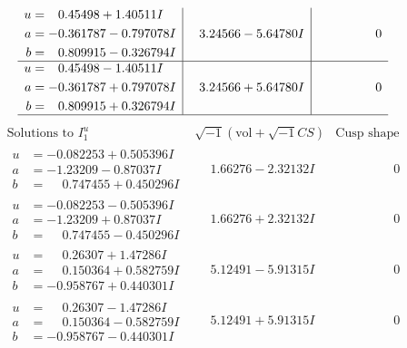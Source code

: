 \documentclass[1p]{elsarticle_modified}
\theoremstyle{definition}
\newcommand{\I}{\sqrt{-1}}
\begin{document}
$$\begin{array}{c|c|c}
\begin{aligned}
u &= \phantom{-}0.45498 + 1.40511 I \\
a &= -0.361787 - 0.797078 I \\
b &= \phantom{-}0.809915 - 0.326794 I\end{aligned}
 & \phantom{-}3.24566 - 5.64780 I & \phantom{-0.000000 } 0 \\ \hline\begin{aligned}
u &= \phantom{-}0.45498 - 1.40511 I \\
a &= -0.361787 + 0.797078 I \\
b &= \phantom{-}0.809915 + 0.326794 I\end{aligned}
 & \phantom{-}3.24566 + 5.64780 I & \phantom{-0.000000 } 0\\
 \hline 
 \end{array}$$\newpage$$\begin{array}{c|c|c}  
\text{Solutions to }I^u_{1}& \I (\text{vol} + \sqrt{-1}CS) & \text{Cusp shape}\\
 \hline 
\begin{aligned}
u &= -0.082253 + 0.505396 I \\
a &= -1.23209 - 0.87037 I \\
b &= \phantom{-}0.747455 + 0.450296 I\end{aligned}
 & \phantom{-}1.66276 - 2.32132 I & \phantom{-0.000000 } 0 \\ \hline\begin{aligned}
u &= -0.082253 - 0.505396 I \\
a &= -1.23209 + 0.87037 I \\
b &= \phantom{-}0.747455 - 0.450296 I\end{aligned}
 & \phantom{-}1.66276 + 2.32132 I & \phantom{-0.000000 } 0 \\ \hline\begin{aligned}
u &= \phantom{-}0.26307 + 1.47286 I \\
a &= \phantom{-}0.150364 + 0.582759 I \\
b &= -0.958767 + 0.440301 I\end{aligned}
 & \phantom{-}5.12491 - 5.91315 I & \phantom{-0.000000 } 0 \\ \hline\begin{aligned}
u &= \phantom{-}0.26307 - 1.47286 I \\
a &= \phantom{-}0.150364 - 0.582759 I \\
b &= -0.958767 - 0.440301 I\end{aligned}
 & \phantom{-}5.12491 + 5.91315 I & \phantom{-0.000000 } 0 \\ \hline\begin{aligned}

\end{aligned}
\end{array}$$
\end{document}
